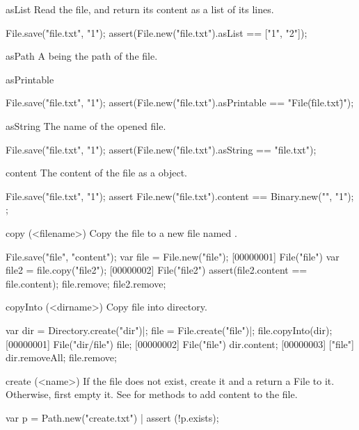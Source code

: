 \begin{urbiscriptapi}
\item[asList]
  Read the file, and return its content as a list of its lines.
\begin{urbiscript}
File.save("file.txt", "1\n");
assert(File.new("file.txt").asList == ["1", "2"]);
\end{urbiscript}

\item[asPath] A  being the path of the file.

\item[asPrintable]
\begin{urbiscript}
File.save("file.txt", "1\n");
assert(File.new("file.txt").asPrintable == "File(\"file.txt\")");
\end{urbiscript}

\item[asString]
  The name of the opened file.
\begin{urbiscript}
File.save("file.txt", "1\n");
assert(File.new("file.txt").asString == "file.txt");
\end{urbiscript}

\item[content]
  The content of the file as a  object.
\begin{urbiscript}
File.save("file.txt", "1\n");
assert
{
  File.new("file.txt").content == Binary.new("", "1\n");
};
\end{urbiscript}

\item[copy](<filename>)
  Copy the file to a new file named .
\begin{urbiscript}
File.save("file", "content");
var file = File.new("file");
[00000001] File("file")
var file2 = file.copy("file2");
[00000002] File("file2")
assert(file2.content == file.content);
file.remove;
file2.remove;
\end{urbiscript}

\item[copyInto](<dirname>)
  Copy file into  directory.
\begin{urbiscript}
var dir = Directory.create("dir")|;
file = File.create("file")|;
file.copyInto(dir);
[00000001] File("dir/file")
file;
[00000002] File("file")
dir.content;
[00000003] ["file"]
dir.removeAll;
file.remove;
\end{urbiscript}

\item[create](<name>)%
  If the file  does not exist, create it and a return a File to
  it.  Otherwise, first empty it.  See  for methods
  to add content to the file.
\begin{urbiscript}
var p = Path.new("create.txt") |
assert (!p.exists);


\end{urbiscript}
\end{urbiscriptapi}
